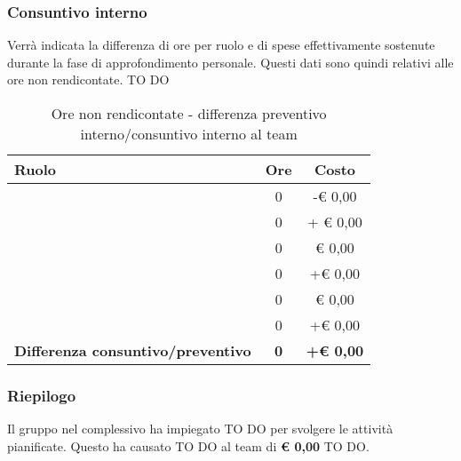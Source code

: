 		\subsubsection{Consuntivo interno} %
		\label{ssub:consuntivo}
		Verrà indicata la differenza di ore per ruolo e di spese effettivamente sostenute durante la fase di approfondimento personale. Questi dati sono quindi relativi alle ore non rendicontate. \newline
		TO DO
		\begin{table}[!h]
			\begin{center}
				\begin{tabularx}{0.75\textwidth}{|X|c|c|}
					\hline
					\textbf{Ruolo} & \textbf{Ore} & \textbf{Costo} \\
					\hline
					\roleProjectManager & 0 & -\euro{} 0,00 \\
					\hline
					\roleAnalyst & 0 & + \euro{} 0,00 \\
					\hline
					\roleDesigner & 0 & \euro{} 0,00 \\
					\hline
					\roleAdministrator & 0  & +\euro{} 0,00 \\
					\hline
					\roleProgrammer & 0 & \euro{} 0,00 \\
					\hline
					\roleVerifier & 0 & +\euro{} 0,00 \\
					\hline
					\textbf{Differenza consuntivo/preventivo} & \textbf{0} & \textbf{+\euro{} 0,00} \\
					\hline
				\end{tabularx}
			\end{center}
		\caption{Ore non rendicontate - differenza preventivo interno/consuntivo interno al team}
		\end{table}

		\subsubsection{Riepilogo} %
		\label{ssub:riepilogo}
		Il gruppo nel complessivo ha impiegato TO DO per svolgere le attività pianificate. \newline
		Questo ha causato TO DO al team di \textbf{\euro{} 0,00} TO DO.
